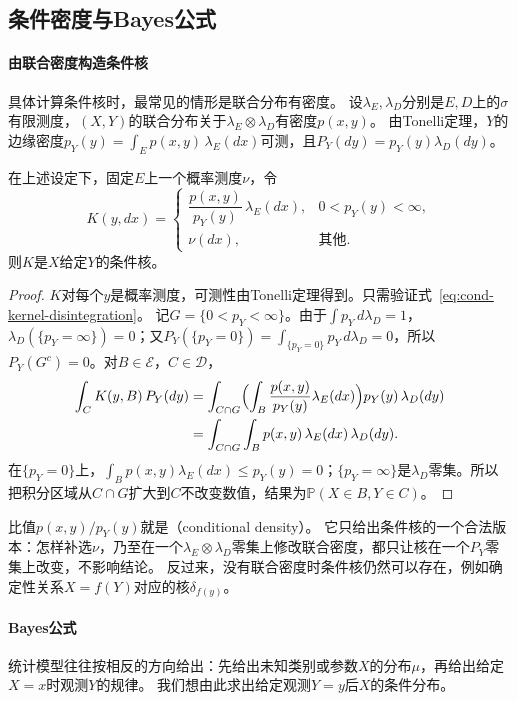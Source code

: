 \subsection{条件密度与Bayes公式}

\paragraph{由联合密度构造条件核}
具体计算条件核时，最常见的情形是联合分布有密度。
设$\lambda_E,\lambda_D$分别是$E,D$上的$\sigma$有限测度，$(X,Y)$的联合分布关于$\lambda_E\otimes\lambda_D$有密度$p(x,y)$。
由Tonelli定理，$Y$的边缘密度$p_Y(y)=\int_Ep(x,y)\,\lambda_E(dx)$可测，且$P_Y(dy)=p_Y(y)\lambda_D(dy)$。

\begin{lemma}[条件密度给出条件核]
\label{lem:cond-density-kernel}
在上述设定下，固定$E$上一个概率测度$\nu$，令
\[
  K(y,dx)=
  \begin{cases}
    \dfrac{p(x,y)}{p_Y(y)}\,\lambda_E(dx), & 0<p_Y(y)<\infty,\\[1ex]
    \nu(dx), & \text{其他}.
  \end{cases}
\]
则$K$是$X$给定$Y$的条件核。
\end{lemma}

\begin{proof}
$K$对每个$y$是概率测度，可测性由Tonelli定理得到。只需验证式~\eqref{eq:cond-kernel-disintegration}。
记$G=\{0<p_Y<\infty\}$。由于$\int p_Y\,d\lambda_D=1$，$\lambda_D(\{p_Y=\infty\})=0$；又$P_Y(\{p_Y=0\})=\int_{\{p_Y=0\}}p_Y\,d\lambda_D=0$，所以$P_Y(G^c)=0$。对$B\in\mathcal E$，$C\in\mathcal D$，
\[
  \begin{aligned}
  \int_CK(y,B)\,P_Y(dy)&=\int_{C\cap G}\Bigl(\int_B\frac{p(x,y)}{p_Y(y)}\lambda_E(dx)\Bigr)p_Y(y)\,\lambda_D(dy)\\
  &=\int_{C\cap G}\int_Bp(x,y)\,\lambda_E(dx)\,\lambda_D(dy).
  \end{aligned}
\]
在$\{p_Y=0\}$上，$\int_Bp(x,y)\lambda_E(dx)\leq p_Y(y)=0$；$\{p_Y=\infty\}$是$\lambda_D$零集。所以把积分区域从$C\cap G$扩大到$C$不改变数值，结果为$\mathbb P(X\in B,Y\in C)$。
\end{proof}

比值$p(x,y)/p_Y(y)$就是（conditional density）。
它只给出条件核的一个合法版本：怎样补选$\nu$，乃至在一个$\lambda_E\otimes\lambda_D$零集上修改联合密度，都只让核在一个$P_Y$零集上改变，不影响结论。
反过来，没有联合密度时条件核仍然可以存在，例如确定性关系$X=f(Y)$对应的核$\delta_{f(y)}$。

\paragraph{Bayes公式}
统计模型往往按相反的方向给出：先给出未知类别或参数$X$的分布$\mu$，再给出给定$X=x$时观测$Y$的规律。
我们想由此求出给定观测$Y=y$后$X$的条件分布。

